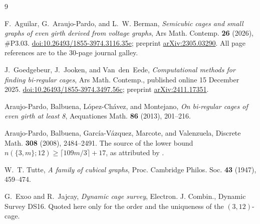 \documentclass[11pt]{amsart}
\theoremstyle{remark}
\begin{document}
\begin{thebibliography}{9}

F.~Aguilar, G.~Araujo-Pardo, and L.~W. Berman,
\emph{Semicubic cages and small graphs of even girth derived from voltage graphs},
Ars Math. Contemp. \textbf{26} (2026), \#P3.03.
\href{https://doi.org/10.26493/1855-3974.3116.35e}{doi:10.26493/1855-3974.3116.35e};
preprint \href{https://arxiv.org/abs/2305.03290}{arXiv:2305.03290}.
All page references are to the $30$-page journal galley.

J.~Goedgebeur, J.~Jooken, and Van~den~Eede,
\emph{Computational methods for finding bi-regular cages},
Ars Math. Contemp., published online 15 December 2025.
\href{https://doi.org/10.26493/1855-3974.3497.56c}{doi:10.26493/1855-3974.3497.56c};
preprint \href{https://arxiv.org/abs/2411.17351}{arXiv:2411.17351}.

Araujo-Pardo, Balbuena, L\'opez-Ch\'avez, and Montejano,
\emph{On bi-regular cages of even girth at least 8},
Aequationes Math. \textbf{86} (2013), 201--216.

Araujo-Pardo, Balbuena, Garc\'ia-V\'azquez, Marcote, and Valenzuela,
Discrete Math. \textbf{308} (2008), 2484--2491.
The source of the lower bound $n(\{3,m\};12)\ge\lceil 109m/3\rceil+17$, as attributed by
\cite[Lemma~3.4 of its reference {[6]}, quoted p.~28]{AAB}.

W.~T. Tutte,
\emph{A family of cubical graphs},
Proc. Cambridge Philos. Soc. \textbf{43} (1947), 459--474.

G.~Exoo and R.~Jajcay,
\emph{Dynamic cage survey},
Electron. J. Combin., Dynamic Survey DS16.
Quoted here only for the order and the uniqueness of the $(3,12)$-cage.

\end{thebibliography}
\end{document}
